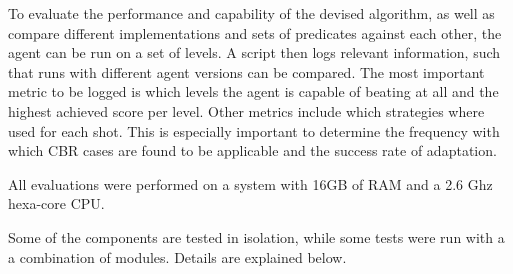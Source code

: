 To evaluate the performance and capability of the devised algorithm, as well as compare different implementations and sets of predicates against each other, the agent can be run on a set of levels.
A script then logs relevant information, such that runs with different agent versions can be compared.
The most important metric to be logged is which levels the agent is capable of beating at all and the highest achieved score per level.
Other metrics include which strategies where used for each shot.
This is especially important to determine the frequency with which \acs{CBR} cases are found to be applicable and the success rate of adaptation.

All evaluations were performed on a system with 16GB of RAM and a 2.6 Ghz hexa-core CPU.

Some of the components are tested in isolation, while some tests were run with a a combination of modules. Details are explained below.